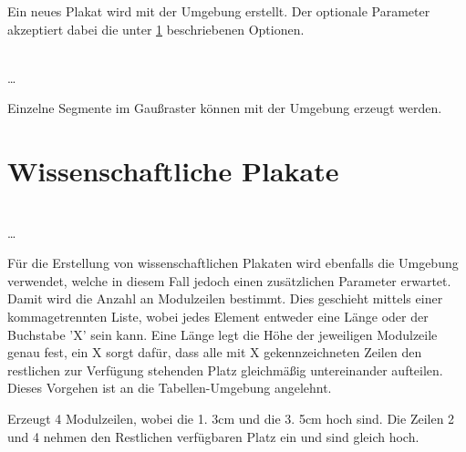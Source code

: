 \documentclass[a4paper,11pt]{tubsreprt}
\begin{document}
Ein neues Plakat wird mit der Umgebung  erstellt.
Der optionale Parameter  akzeptiert dabei die
unter \ref{} beschriebenen Optionen.

\begin{Declaration}
    \\%
  \quad\dots\\
\end{Declaration}

Einzelne Segmente im Gaußraster können mit der Umgebung 
erzeugt werden.

\section{Wissenschaftliche Plakate}

\begin{Declaration}
    \\
  \quad\dots\\
\end{Declaration}

Für die Erstellung von wissenschaftlichen Plakaten wird ebenfalls die Umgebung
 verwendet, welche in diesem Fall jedoch einen
zusätzlichen Parameter  erwartet.
Damit wird die Anzahl an Modulzeilen bestimmt. Dies geschieht mittels
einer kommagetrennten Liste, wobei jedes Element entweder eine Länge
oder der Buchstabe 'X' sein kann. Eine Länge legt die Höhe der jeweiligen
Modulzeile genau fest, ein X sorgt dafür, dass alle mit X gekennzeichneten
Zeilen den restlichen zur Verfügung stehenden Platz gleichmäßig untereinander
aufteilen. Dieses Vorgehen ist an die Tabellen-Umgebung 
angelehnt.

\begin{Example}
  \noindent{}
    \par
  \noindent Erzeugt 4 Modulzeilen, wobei die 1. 3cm und die 3. 5cm hoch sind.
  Die Zeilen 2 und 4 nehmen den Restlichen verfügbaren Platz ein
  und sind gleich hoch.
\end{Example}
\end{document}
